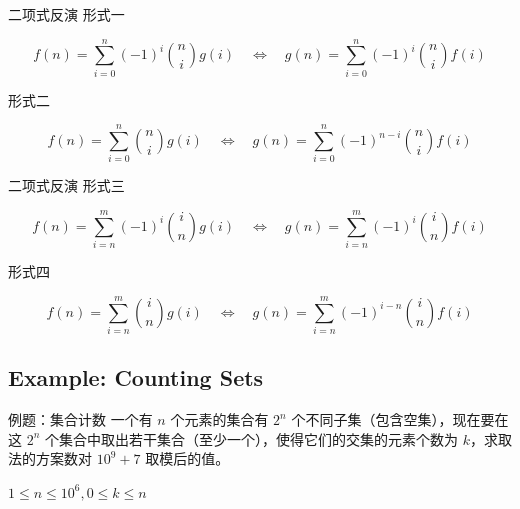 \documentclass[12pt,aspectratio=169,handout]{beamer}
\begin{document}
\begin{frame}[fragile]{二项式反演}
形式一

$$
f(n) = \sum_{i=0}^{n} (-1)^i {n \choose i} g(i)
\quad \Longleftrightarrow \quad
g(n) = \sum_{i=0}^{n} (-1)^i {n \choose i} f(i)
$$

形式二

$$
f(n) = \sum_{i=0}^{n} {n \choose i} g(i)
\quad \Longleftrightarrow \quad
g(n) = \sum_{i=0}^{n} (-1)^{n-i} {n \choose i} f(i)
$$
\end{frame}

\begin{frame}[fragile]{二项式反演}
形式三

$$
f(n) = \sum_{i=n}^{m} (-1)^i {i \choose n} g(i)
\quad \Longleftrightarrow \quad
g(n) = \sum_{i=n}^{m} (-1)^i {i \choose n} f(i)
$$

形式四

$$
f(n) = \sum_{i=n}^{m} {i \choose n} g(i)
\quad \Longleftrightarrow \quad
g(n) = \sum_{i=n}^{m} (-1)^{i-n} {i \choose n} f(i)
$$
\end{frame}

\subsection[例题：集合计数]{Example: Counting Sets}

\begin{frame}[fragile]{例题：集合计数}
一个有 $n$ 个元素的集合有 $2^n$ 个不同子集（包含空集），现在要在这 $2^n$ 个集合中取出若干集合（至少一个），使得它们的交集的元素个数为 $k$，求取法的方案数对 $10^9+7$ 取模后的值。

$1 \le n \le 10^6, 0 \le k \le n$
\end{frame}





\end{document}
